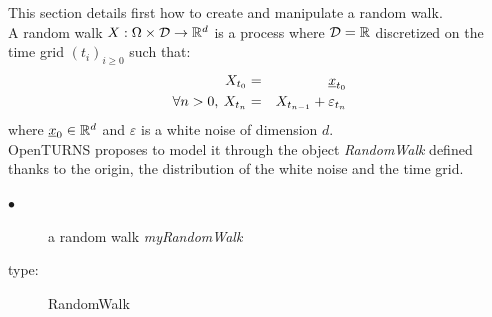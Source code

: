 \renewcommand{\filename}{docUC_StochProc_RandomWalk.tex}
\renewcommand{\filetitle}{UC : Creation of a Random Walk}

\HeaderIIILevel

\label{processWN}



This section details first how to create and manipulate a random walk.\\

A random walk $X: \Omega \times {\mathcal D} \rightarrow {\mathbb R}^d$ is a  process where ${\mathcal D}={\mathbb R}$ discretized on the time grid $(t_i)_{i \geq 0}$ such that:
\begin{eqnarray}
  X_{t_0} & = & {\underline{x}}_{t_0} \\
  \forall n>0,\: X_{t_n} & = & X_{t_{n-1}} + \varepsilon_{t_n}
\end{eqnarray}
where ${\underline{x}}_0 \in {\mathbb R}^d$ and $\varepsilon$ is a  white noise of dimension $d$.\\

OpenTURNS proposes to model it through the object \emph{RandomWalk} defined thanks to the origin, the distribution of the white noise and the time grid.\\


{
  \begin{description}
  \item[$\bullet$] a random walk {\itshape myRandomWalk}
  \item[type:]  RandomWalk
  \end{description}
}

